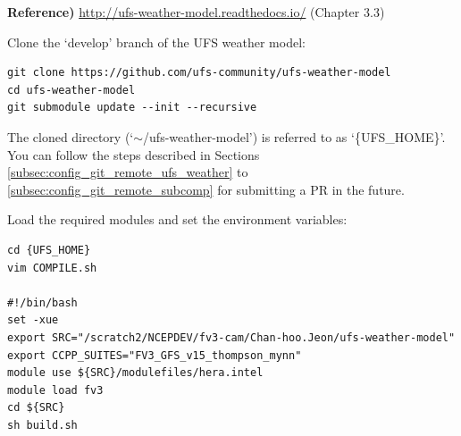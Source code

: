 \documentclass[11pt,fleqn]{report}              %
\begin{document}
{\bf Reference)} \url{http://ufs-weather-model.readthedocs.io/} (Chapter 3.3)

\vspace{0.3cm}

Clone the `develop' branch of the UFS weather model:
\lstset{language=bash}   
\begin{lstlisting}[frame=trBL]
git clone https://github.com/ufs-community/ufs-weather-model
cd ufs-weather-model
git submodule update --init --recursive
\end{lstlisting}
The cloned directory (`$\sim$/ufs-weather-model') is referred to as `\{UFS\_HOME\}'. You can follow the steps described in Sections \ref{subsec:config_git_remote_ufs_weather} to \ref{subsec:config_git_remote_subcomp} for submitting a PR in the future.

\vspace{0.5cm}

Load the required modules and set the environment variables:
\lstset{language=bash}   
\begin{lstlisting}[frame=trBL]
cd {UFS_HOME}
vim COMPILE.sh

#!/bin/bash
set -xue
export SRC="/scratch2/NCEPDEV/fv3-cam/Chan-hoo.Jeon/ufs-weather-model"
export CCPP_SUITES="FV3_GFS_v15_thompson_mynn"
module use ${SRC}/modulefiles/hera.intel
module load fv3
cd ${SRC}
sh build.sh
\end{lstlisting}

\vspace{0.3cm}
\end{document}

